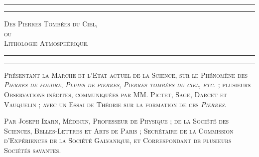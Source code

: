 \documentclass[a4paper, 11pt, oneside, polutonikogreek, french]{article}
\begin{document}
\begin{titlepage} %
	\centering %

	
	\rule{\textwidth}{1.6pt}\vspace*{-\baselineskip}\vspace*{2pt} %
	\rule{\textwidth}{0.4pt} %
	
	\vspace{1\baselineskip} %
	
	{\scshape\Huge Des Pierres Tombées du Ciel,\\ ou\\ Lithologie Atmosphérique.}
	
	\vspace{1\baselineskip} %

	\rule{\textwidth}{0.4pt}\vspace*{-\baselineskip}\vspace{3.2pt} %
	\rule{\textwidth}{1.6pt} %
	
	\vspace{1\baselineskip} %
	
	
	{\scshape \Large Présentant la Marche et l'Etat actuel de la Science, sur le Phénomène des \emph{Pierres de foudre}, \emph{Pluies de pierres}, \emph{Pierres tombées du ciel}, \emph{etc.} ; plusieurs Observations inédites, communiquées par MM. Pictet, Sage, Darcet et Vauquelin ; avec un Essai de Théorie sur la formation de ces \emph{Pierres}.} %
	
	\vspace*{1\baselineskip} %
	
        {\scshape Par Joseph Izarn, Médecin, Professeur de Physique ; de la Société des Sciences, Belles-Lettres et Arts de Paris ; Secrétaire de la Commission d'Expériences de la Société Galvanique, et Correspondant de plusieurs Sociétés savantes. } %
    
        \vspace*{\fill}


\end{titlepage}
\end{document}
